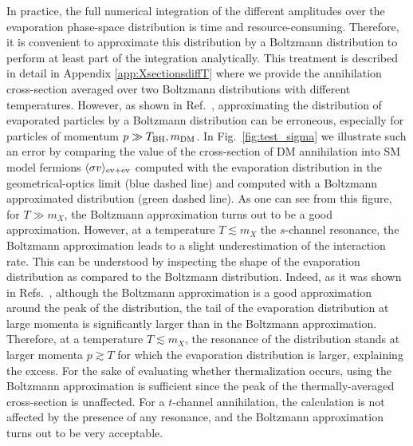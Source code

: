 \documentclass[aps,prd,reprint,twocolumn,preprintnumbers,floatfix,nofootinbib]{revtex4-1}
\newcommand{\mDM}{m_{\rm DM}}
\newcommand{\TBH}{T_{\rm BH}}
\begin{document}
In practice, the full numerical integration of the different amplitudes over the evaporation phase-space distribution is time and resource-consuming. Therefore, it is convenient to approximate this distribution by a Boltzmann distribution to perform at least part of the integration analytically. This treatment is described in detail in Appendix \ref{app:XsectionsdiffT} where we provide the annihilation cross-section averaged over two Boltzmann distributions with different temperatures. However, as shown in Ref.~\cite{paper1}, approximating the distribution of evaporated particles by a Boltzmann distribution can be erroneous, especially for particles of momentum $p\gg \TBH,\mDM$. In Fig.~\ref{fig:test_sigma} we illustrate such an error by comparing the value of the cross-section of DM annihilation into SM model fermions $\langle\sigma v\rangle_{\rm ev+ev}$ computed with the evaporation distribution in the geometrical-optics limit (blue dashed line) \cite{paper1, Baldes:2020nuv} and computed with a Boltzmann approximated distribution (green dashed line). 
{As one can see from this figure, for $T\gg m_X$, the Boltzmann approximation turns out to be a good approximation. However, at a temperature $T\lesssim m_X$ the $s$-channel resonance,  the Boltzmann approximation leads to a slight underestimation of the interaction rate.} This can be understood by inspecting the shape of the evaporation distribution as compared to the Boltzmann distribution. Indeed, as it was shown in Refs.~\cite{paper1, Baldes:2020nuv}, although the Boltzmann approximation is a good approximation around the peak of the distribution, the tail of the evaporation distribution at large momenta is significantly larger than in the Boltzmann approximation. Therefore, at a temperature $T \lesssim m_X$, the resonance of the distribution stands at larger momenta $p\gtrsim T$ for which the evaporation distribution is larger, explaining the excess. For the sake of evaluating whether thermalization occurs, using the Boltzmann approximation is sufficient since the peak of the thermally-averaged cross-section is unaffected. For a $t$-channel annihilation, the calculation is not affected by the presence of any resonance, and the Boltzmann approximation turns out to be very acceptable.
\end{document}
